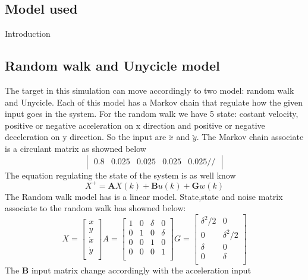 \documentclass{article}
\begin{document}
\begin{multicols}{2}
    \section*{Model used}
    Introduction
    
    \subsection*{Random walk and Unycicle model}
    The target in this simulation can move accordingly to two model: random walk and Unycicle. Each of this model has a Markov chain that 
    regulate how the given input goes in the system. For the random walk we have 5 state: costant velocity, positive or negative acceleration
     on x direction and positive or negative deceleration on y direction. So the input are $\ddot{x}$ and $\ddot{y}$. The Markov chain associate is a circulant matrix as showned below
     $$\begin{vmatrix}
         0.8 & 0.025 & 0.025 & 0.025 & 0.025 // 
     \end{vmatrix}$$
     The equation regulating the state of the system is as well know
    \begin{equation}
    X^{+}= \textbf{A}X(k) + \textbf{B}u(k) + \textbf{G}w(k)
    \end{equation}
    The Random walk model has is a linear model. State,state and noise matrix associate to the random walk has showned below:
    \[ X=\begin{bmatrix} x \\ y \\ \dot{x} \\ \dot{y} \\ \end{bmatrix}  A=\begin{bmatrix}
        1&0&\delta&0\\
        0&1&0&\delta\\
        0&0&1&0\\
        0&0&0&1\\
        \end{bmatrix}
        G=\begin{bmatrix}
            \delta^2/2&0\\
            0&\delta^2/2\\
            \delta&0\\
            0&\delta\\
            \end{bmatrix}
        \]
        The \textbf{B} input matrix change accordingly with the acceleration input

\end{multicols}
\end{document}

